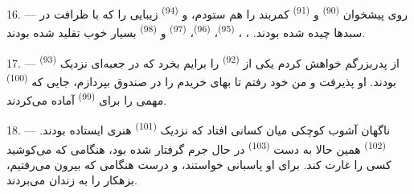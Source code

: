 16. --- روی پیشخوان  \textsuperscript{(90)} و
 \textsuperscript{(91)} کمربند را هم ستودم، و
 \textsuperscript{(94)} زیبایی را که با ظرافت در
سبدها چیده شده بودند. ، ،
 \textsuperscript{(95)}، 
\textsuperscript{(96)}،  \textsuperscript{(97)} و
 \textsuperscript{(98)} بسیار خوب تقلید شده بودند.

\VUsaut{4.4mm}
\VUsaut{2.8mm}

17. --- از پدربزرگم خواهش کردم یکی از 
\textsuperscript{(92)} را برایم بخرد که در جعبه‌ای نزدیک
 \textsuperscript{(93)} بودند. او پذیرفت و من خود
رفتم تا بهای خریدم را در صندوق بپردازم، جایی که 
\textsuperscript{(100)} مهمی را برای 
\textsuperscript{(99)} آماده می‌کردند.

18. --- ناگهان آشوب کوچکی میان کسانی افتاد که نزدیک 
\textsuperscript{(101)} هنری ایستاده بودند. 
\textsuperscript{(102)} همین حالا به دست 
\textsuperscript{(103)} در حال جرم گرفتار شده بود، هنگامی که می‌کوشید
کسی را غارت کند. برای  او پاسبانی خواستند، و درست
هنگامی که بیرون می‌رفتیم، بزهکار را به زندان می‌بردند.

\VUsaut{6.0mm}
\VUfilet{22mm}
